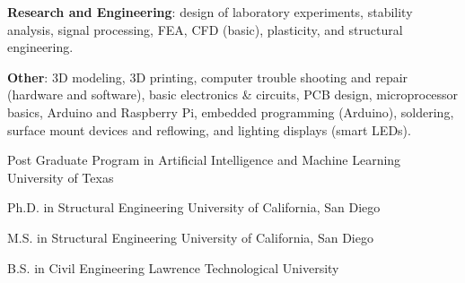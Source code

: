 \documentclass{leresume}
\begin{document}
\begin{bulletedlist}
		\item \textbf{Research and Engineering}: design of laboratory experiments,
                        stability analysis,
                        signal processing,
                        FEA,
                        CFD (basic),
                        plasticity,
                        and structural engineering.
                        
		\item \textbf{Other}: 3D modeling,
                        3D printing,
                        computer trouble shooting and repair (hardware and software),
                        basic electronics \& circuits,
                        PCB design,
                        microprocessor basics,
                        Arduino and Raspberry Pi,
                        embedded programming (Arduino),
                        soldering,
                        surface mount devices and reflowing,
                        and lighting displays (smart LEDs).
                        
	\end{bulletedlist}
	

	
                {Post Graduate Program in Artificial Intelligence and Machine Learning}
                {University of Texas}
		
                {Ph.D. in Structural Engineering}
                {University of California, San Diego}
		
                {M.S. in Structural Engineering}
                {University of California, San Diego}
		
                {B.S. in Civil Engineering}
                {Lawrence Technological University}
		

    
\end{document}
